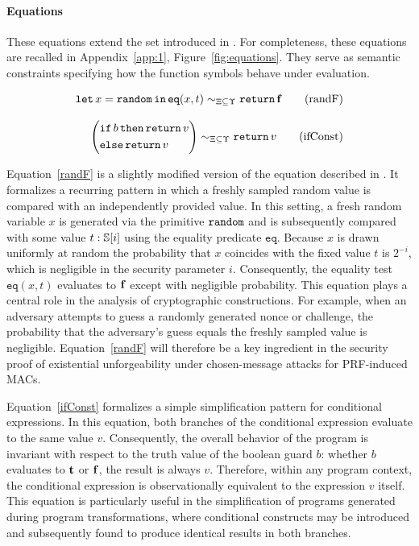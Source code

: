 \paragraph{Equations}
These equations extend the set introduced in \cite{lago2024-extended}. For completeness, these equations are recalled in Appendix~\ref{app:1}, Figure~\ref{fig:equations}. They serve as semantic constraints specifying how the function symbols behave under evaluation.

\begin{figure}[htpb]
    \centering
    \begin{align*}
        \mathtt{let}\,x=\mathtt{random}\,\mathtt{in}\, \mathtt{eq}(x,t) \sim_{\Xi\subseteq\Upsilon} \mathtt{return}\, \mathbf{f} \tag{randF}\label{randF} 
        \\[2ex]
        \left(\begin{aligned}
            &\mathtt{if}\,b\,\mathtt{then}\,\mathtt{return}\, v \\
            &\mathtt{else}\,\mathtt{return}\, v
        \end{aligned}\right) \sim_{\Xi\subseteq\Upsilon} \mathtt{return}\, v \tag{ifConst}\label{ifConst}
    \end{align*}
\end{figure}

Equation~\ref{randF} is a slightly modified version of the equation described in \cite{lago2024computationalindistinguishabilitylogicalrelations}. It formalizes a recurring pattern in which a freshly sampled random value is compared with an independently provided value. In this setting, a fresh random variable $x$ is generated via the primitive $\mathtt{random}$ and is subsequently compared with some value $t:\mathbb{S}[i]$ using the equality predicate $\mathtt{eq}$. Because $x$ is drawn uniformly at random the probability that $x$ coincides with the fixed value $t$ is $2^{-i}$, which is negligible in the security parameter $i$. Consequently, the equality test $\mathtt{eq}(x,t)$ evaluates to $\mathbf{f}$ except with negligible probability. This equation plays a central role in the analysis of cryptographic constructions. For example, when an adversary attempts to guess a randomly generated nonce or challenge, the probability that the adversary's guess equals the freshly sampled value is negligible. Equation~\ref{randF} will therefore be a key ingredient in the security proof of existential unforgeability under chosen-message attacks for PRF-induced MACs.

Equation~\ref{ifConst} formalizes a simple simplification pattern for conditional expressions. In this equation, both branches of the conditional expression evaluate to the same value $v$. Consequently, the overall behavior of the program is invariant with respect to the truth value of the boolean guard $b$: whether $b$ evaluates to $\mathbf{t}$ or $\mathbf{f}$, the result is always $v$. Therefore, within any program context, the conditional expression is observationally equivalent to the expression $v$ itself. This equation is particularly useful in the simplification of programs generated during program transformations, where conditional constructs may be introduced and subsequently found to produce identical results in both branches.

